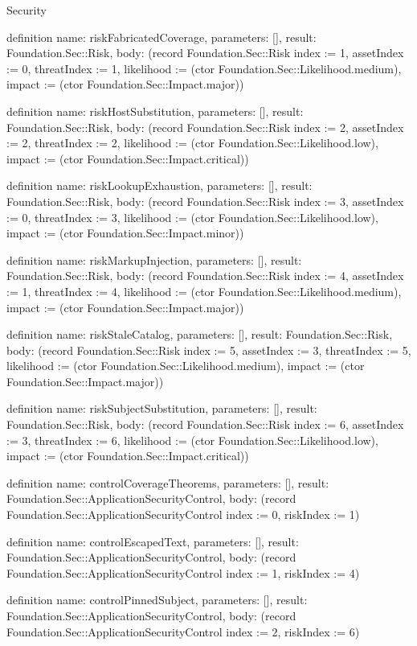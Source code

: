 \begin{lexlean}{Security}
\begin{semanticmodule}
definition{
  name: riskFabricatedCoverage,
  parameters: [],
  result: Foundation.Sec::Risk,
  body: (record Foundation.Sec::Risk {index := 1, assetIndex := 0, threatIndex := 1, likelihood := (ctor Foundation.Sec::Likelihood.medium), impact := (ctor Foundation.Sec::Impact.major)})
}

definition{
  name: riskHostSubstitution,
  parameters: [],
  result: Foundation.Sec::Risk,
  body: (record Foundation.Sec::Risk {index := 2, assetIndex := 2, threatIndex := 2, likelihood := (ctor Foundation.Sec::Likelihood.low), impact := (ctor Foundation.Sec::Impact.critical)})
}

definition{
  name: riskLookupExhaustion,
  parameters: [],
  result: Foundation.Sec::Risk,
  body: (record Foundation.Sec::Risk {index := 3, assetIndex := 0, threatIndex := 3, likelihood := (ctor Foundation.Sec::Likelihood.low), impact := (ctor Foundation.Sec::Impact.minor)})
}

definition{
  name: riskMarkupInjection,
  parameters: [],
  result: Foundation.Sec::Risk,
  body: (record Foundation.Sec::Risk {index := 4, assetIndex := 1, threatIndex := 4, likelihood := (ctor Foundation.Sec::Likelihood.medium), impact := (ctor Foundation.Sec::Impact.major)})
}

definition{
  name: riskStaleCatalog,
  parameters: [],
  result: Foundation.Sec::Risk,
  body: (record Foundation.Sec::Risk {index := 5, assetIndex := 3, threatIndex := 5, likelihood := (ctor Foundation.Sec::Likelihood.medium), impact := (ctor Foundation.Sec::Impact.major)})
}

definition{
  name: riskSubjectSubstitution,
  parameters: [],
  result: Foundation.Sec::Risk,
  body: (record Foundation.Sec::Risk {index := 6, assetIndex := 3, threatIndex := 6, likelihood := (ctor Foundation.Sec::Likelihood.low), impact := (ctor Foundation.Sec::Impact.critical)})
}

definition{
  name: controlCoverageTheorems,
  parameters: [],
  result: Foundation.Sec::ApplicationSecurityControl,
  body: (record Foundation.Sec::ApplicationSecurityControl {index := 0, riskIndex := 1})
}

definition{
  name: controlEscapedText,
  parameters: [],
  result: Foundation.Sec::ApplicationSecurityControl,
  body: (record Foundation.Sec::ApplicationSecurityControl {index := 1, riskIndex := 4})
}

definition{
  name: controlPinnedSubject,
  parameters: [],
  result: Foundation.Sec::ApplicationSecurityControl,
  body: (record Foundation.Sec::ApplicationSecurityControl {index := 2, riskIndex := 6})
}


\end{semanticmodule}
\end{lexlean}
